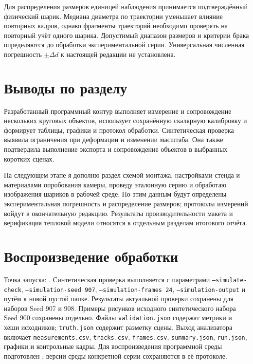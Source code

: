 \documentclass[12pt,a4paper]{article}
\begin{document}
Для распределения размеров единицей наблюдения принимается подтверждённый физический шарик. Медиана диаметра по траектории уменьшает влияние повторных кадров, однако фрагменты траекторий необходимо проверять на повторный учёт одного шарика. Допустимый диапазон размеров и критерии брака определяются до обработки экспериментальной серии. Универсальная численная погрешность $\pm\Delta d$ к настоящей редакции не установлена.

\section{Выводы по разделу}
Разработанный программный контур выполняет измерение и сопровождение нескольких круговых объектов, использует сохранённую скалярную калибровку и формирует таблицы, графики и протокол обработки. Синтетическая проверка выявила ограничения при деформации и изменении масштаба. Она также подтвердила выполнение экспорта и сопровождение объектов в выбранных коротких сценах.

На следующем этапе я дополню раздел схемой монтажа, настройками стенда и материалами опробования камеры, проведу эталонную серию и обработаю изображения шариков в рабочей среде. По этим данным будут определены экспериментальная погрешность и распределение размеров; протоколы измерений войдут в окончательную редакцию. Результаты производительности макета и верификация тепловой модели относятся к отдельным разделам итогового отчёта.

\appendix
\section{Воспроизведение обработки}
\small
Точка запуска: . Синтетическая проверка выполняется с параметрами \texttt{--simulate-check}, \texttt{--simulation-seed 907}, \texttt{--simulation-frames 24}, \texttt{--simulation-output} и путём к новой пустой папке. Результаты актуальной проверки сохранены для наборов Seed 907 и 908. Примеры рисунков исходного синтетического набора Seed 900 сохранены отдельно. Файлы \texttt{validation.json} содержат метрики и хеши исходников; \texttt{truth.json} содержит разметку сцены. Выход анализатора включает \texttt{measurements.csv}, \texttt{tracks.csv}, \texttt{frames.csv}, \texttt{summary.json}, \texttt{run.json}, графики и контрольные кадры. Для воспроизведения программной среды подготовлен ; версии среды конкретной серии сохраняются в её протоколе.
\end{document}
